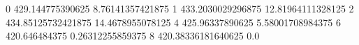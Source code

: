 0 429.144775390625 8.76141357421875
1 433.2030029296875 12.81964111328125
2 434.85125732421875 14.4678955078125
4 425.96337890625 5.58001708984375
6 420.646484375 0.26312255859375
8 420.38336181640625 0.0
